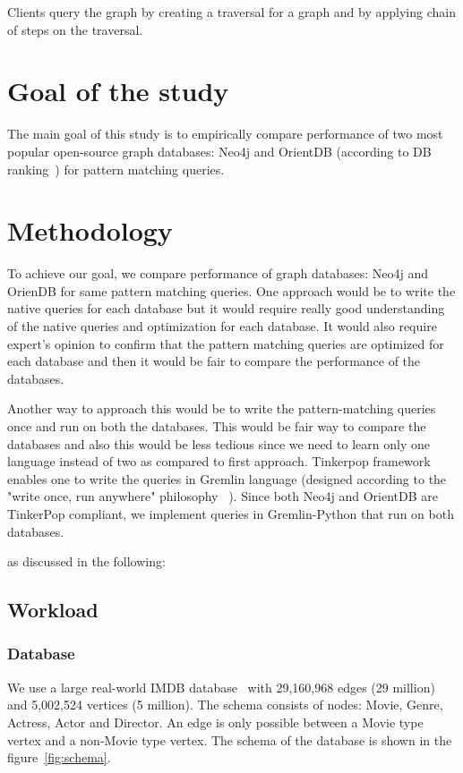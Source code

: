 Clients query the graph by creating a traversal for a graph and by applying chain of steps on the traversal.

\section{Goal of the study}

The main goal of this study is to empirically compare performance of two most popular open-source graph databases: Neo4j and OrientDB (according to DB ranking~\cite{dbranking}) for pattern matching queries.

\section{Methodology}

To achieve our goal, we compare performance of graph databases: Neo4j and OrienDB for same pattern matching queries. One approach would be to write the native queries for each database but it would require really good understanding of the native queries and optimization for each database. It would also require expert's opinion to confirm that the pattern matching queries are optimized for each database and then it would be fair to compare the performance of the databases.

Another way to approach this would be to write the pattern-matching queries once and run on both the databases. This would be fair way to compare the databases and also this would be less tedious since we need to learn only one language instead of two as compared to first approach. Tinkerpop framework enables one to write the queries in Gremlin language (designed according to the "write once, run anywhere" philosophy ~\cite{gremlin}). Since both Neo4j and OrientDB are TinkerPop compliant, we implement queries in Gremlin-Python that run on both databases. 

  as discussed in the following:  

\subsection{Workload}

\subsubsection{Database}

We use a large real-world IMDB database~\cite{IMDb96:online} with 29,160,968 edges (29 million) and 5,002,524 vertices (5 million). The schema consists of nodes: Movie, Genre, Actress, Actor and Director. An edge is only possible between a Movie type vertex and a non-Movie type vertex. The schema of the database is shown in the figure~\ref{fig:schema}. 

